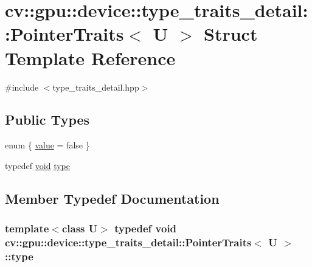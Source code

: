 \hypertarget{structcv_1_1gpu_1_1device_1_1type__traits__detail_1_1PointerTraits}{\section{cv\-:\-:gpu\-:\-:device\-:\-:type\-\_\-traits\-\_\-detail\-:\-:Pointer\-Traits$<$ U $>$ Struct Template Reference}
\label{structcv_1_1gpu_1_1device_1_1type__traits__detail_1_1PointerTraits}
}


{\ttfamily \#include $<$type\-\_\-traits\-\_\-detail.\-hpp$>$}

\subsection*{Public Types}
\begin{DoxyCompactItemize}
\item 
enum \{ \hyperlink{structcv_1_1gpu_1_1device_1_1type__traits__detail_1_1PointerTraits_a87facce7ffc7f29bcce08a7e62efd1a6aa07a6b1c32d5e05413d08381dd012edb}{value} = false
 \}
\item 
typedef \hyperlink{legacy_8hpp_a8bb47f092d473522721002c86c13b94e}{void} \hyperlink{structcv_1_1gpu_1_1device_1_1type__traits__detail_1_1PointerTraits_a799277917fad7901dd36566aaeae503d}{type}
\end{DoxyCompactItemize}


\subsection{Member Typedef Documentation}
\hypertarget{structcv_1_1gpu_1_1device_1_1type__traits__detail_1_1PointerTraits_a799277917fad7901dd36566aaeae503d}{
\subsubsection[{type}]{\setlength{\rightskip}{0pt plus 5cm}template$<$class U$>$ typedef {\bf void} {\bf cv\-::gpu\-::device\-::type\-\_\-traits\-\_\-detail\-::\-Pointer\-Traits}$<$ {\bf U} $>$\-::{\bf type}}}\label{structcv_1_1gpu_1_1device_1_1type__traits__detail_1_1PointerTraits_a799277917fad7901dd36566aaeae503d}


